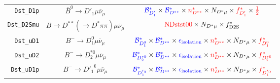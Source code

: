 \begin{landscape}
\begin{table}
\begin{tabular}{r|c|c}
     \texttt{Dst\_D1p} &             $\overline{B}^0 \rightarrow D'_1 \mu \overline{\nu}_\mu$              &                                                                                          $\textcolor{blue}{\mathcal{B}^{*}_{D'_1}} \times \textcolor{blue}{\mathcal{B}^*_{D^{**}}} \times \textcolor{red}{n^{*}_{D^{**}}} \times N_{D^* \mu} \times \textcolor{red}{f^{*}_{D'_1}} \times \textcolor{red}{\frac{1}{2}}$                                                                                          \\
   \texttt{Dst\_D2Smu} & $\overline{B} \rightarrow D^{**} (\rightarrow D^* \pi\pi) \mu \overline{\nu}_\mu$ &                                                                                                                                                                  $\textcolor{red}{\text{NDstst00}} \times N_{D^* \mu} \times f^{*}_\text{D2S}$                                                                                                                                                                  \\
     \texttt{Dst\_uD1} &                  $B^- \rightarrow D_1^0 \mu \overline{\nu}_\mu$                   &                                                                                 $\textcolor{blue}{\mathcal{B}^{*}_{D_1^0}} \times \textcolor{blue}{\mathcal{B}^*_{D^{**}}} \times \textcolor{blue}{\epsilon_\text{isolation}} \times \textcolor{red}{n^{*}_{D^{**}}} \times N_{D^* \mu} \times \textcolor{red}{f^{*}_{D_1^0}}$                                                                                  \\
     \texttt{Dst\_uD2} &                 $B^- \rightarrow D_2^{*0} \mu \overline{\nu}_\mu$                 &                                                                              $\textcolor{blue}{\mathcal{B}^{*}_{D_2^{*0}}} \times \textcolor{blue}{\mathcal{B}^*_{D^{**}}} \times \textcolor{blue}{\epsilon_\text{isolation}} \times \textcolor{red}{n^{*}_{D^{**}}} \times N_{D^* \mu} \times \textcolor{red}{f^{*}_{D_2^{*0}}}$                                                                               \\
    \texttt{Dst\_uD1p} &                 $B^- \rightarrow {D'_1}^0 \mu \overline{\nu}_\mu$                 &                                                                              $\textcolor{blue}{\mathcal{B}^{*}_{D_1^{'0}}} \times \textcolor{blue}{\mathcal{B}^*_{D^{**}}} \times \textcolor{blue}{\epsilon_\text{isolation}} \times \textcolor{red}{n^{*}_{D^{**}}} \times N_{D^* \mu} \times \textcolor{red}{f^{*}_{D_1^{'0}}}$                                                                               \\

\end{tabular}
\end{table}
\end{landscape}
